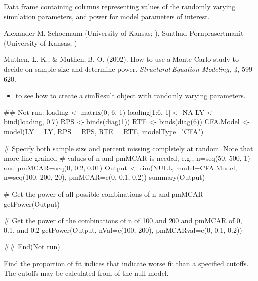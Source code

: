 \documentclass[a4paper]{book}
\begin{document}
%
\begin{Value}
Data frame containing columns representing values of the randomly varying simulation parameters, and power for model parameters of interest.
\end{Value}
%
\begin{Author}\relax
Alexander M. Schoemann (University of Kansas; ), Sunthud Pornprasertmanit (University of Kansas; )
\end{Author}
%
\begin{References}\relax
Muthen, L. K., \& Muthen, B. O. (2002). How to use a Monte Carlo study to decide on sample size and determine power. \emph{Structural Equation Modeling, 4,} 599-620.
\end{References}
%
\begin{SeeAlso}\relax
\begin{itemize}

\item {} to see how to create a simResult object with randomly varying parameters.

\end{itemize}

\end{SeeAlso}
%
\begin{Examples}
\begin{ExampleCode}
## Not run: 
loading <- matrix(0, 6, 1)
loading[1:6, 1] <- NA
LY <- bind(loading, 0.7)
RPS <- binds(diag(1))
RTE <- binds(diag(6))
CFA.Model <- model(LY = LY, RPS = RPS, RTE = RTE, modelType="CFA")

# Specify both sample size and percent missing completely at random. Note that more fine-grained 
# values of n and pmMCAR is needed, e.g., n=seq(50, 500, 1) and pmMCAR=seq(0, 0.2, 0.01)
Output <- sim(NULL, model=CFA.Model, n=seq(100, 200, 20), pmMCAR=c(0, 0.1, 0.2))
summary(Output)

# Get the power of all possible combinations of n and pmMCAR
getPower(Output)

# Get the power of the combinations of n of 100 and 200 and pmMCAR of 0, 0.1, and 0.2
getPower(Output, nVal=c(100, 200), pmMCARval=c(0, 0.1, 0.2))

## End(Not run)
\end{ExampleCode}
\end{Examples}
%
\begin{Description}\relax
Find the proportion of fit indices that indicate worse fit than a specified cutoffs. The cutoffs may be calculated from  of the null model.
\end{Description}
\end{document}
